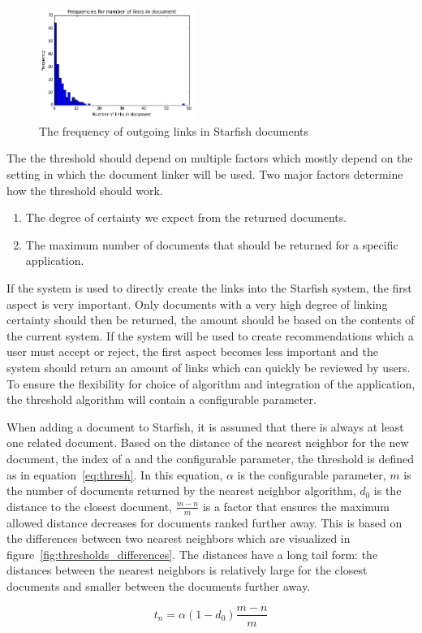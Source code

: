 \begin{figure}[h]
\centering
\includegraphics[width =0.45\textwidth]{images/link_histogram}
\caption{The frequency of outgoing links in Starfish documents}
\label{fig:link_histogram}
\end{figure}

The the threshold should depend on multiple factors which mostly depend on the setting in which the document linker will be used. Two major factors determine how the threshold should work.
\begin{enumerate}[1.]
	\item The degree of certainty we expect from the returned documents.
	\item The maximum number of documents that should be returned for a specific application.
\end{enumerate}
If the system is used to directly create the links into the Starfish system, the first aspect is very important. Only documents with a very high degree of linking certainty should then be returned, the amount should be based on the contents of the current system. If the system will be used to create recommendations which a user must accept or reject, the first aspect becomes less important and the system should return an amount of links which can quickly be reviewed by users. To ensure the flexibility for choice of algorithm and integration of the application, the threshold algorithm will contain a configurable parameter.

When adding a document to Starfish, it is assumed that there is always at least one related document. Based on the distance of the nearest neighbor for the new document, the index of a and the configurable parameter, the threshold is defined as in equation~\ref{eq:thresh}. In this equation, $\alpha$ is the configurable parameter, $m$ is the number of documents returned by the nearest neighbor algorithm, $d_0$ is the distance to the closest document, $\frac{m - n}{m}$ is a factor that ensures the maximum allowed distance decreases for documents ranked further away. This is based on the differences between two nearest neighbors which are visualized in figure~\ref{fig:thresholds_differences}. The distances have a long tail form: the distances between the nearest neighbors is relatively large for the closest documents and smaller between the documents further away. 

\begin{equation}
t_n = \alpha (1 - d_0) \frac{m - n}{m}
\label{eq:thresh}
\end{equation}
